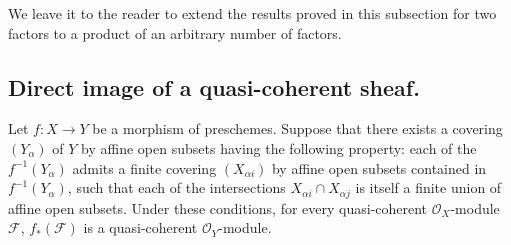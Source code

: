 We leave it to the reader to extend the results proved in this subsection
for two factors to a product of an arbitrary number of factors.

\subsection{Direct image of a quasi-coherent sheaf.}
\label{subsection:I.9.2}

\begin{proposition}[9.2.1]
\label{I.9.2.1}
Let $f:X\to Y$ be a morphism of preschemes. Suppose that there exists a
covering $(Y_\alpha)$ of $Y$ by affine open subsets having the following
property: each of the $f^{-1}(Y_\alpha)$ admits a finite covering
$(X_{\alpha i})$ by affine open subsets contained in
$f^{-1}(Y_\alpha)$, such that each of the intersections
$X_{\alpha i}\cap X_{\alpha j}$ is itself a finite union of affine open
subsets. Under these conditions, for every quasi-coherent
$\mathscr{O}_X$-module $\mathscr{F}$, $f_*(\mathscr{F})$ is a
quasi-coherent $\mathscr{O}_Y$-module.
\end{proposition}

